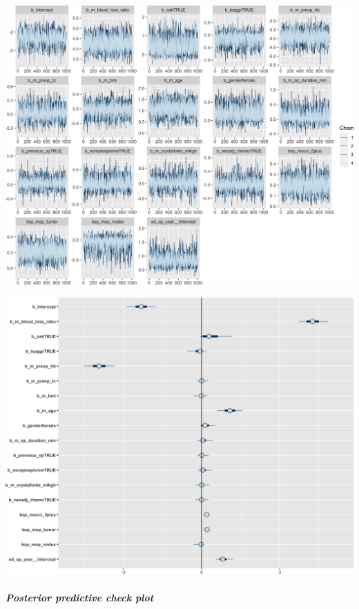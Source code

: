 \documentclass[
]{article}
\begin{document}
\begin{center}\includegraphics[width=1\linewidth]{notebook_files/figure-latex/model1full_diagnostics-1} \end{center}

\begin{center}\includegraphics[width=1\linewidth]{notebook_files/figure-latex/model1full_diagnostics-2} \end{center}

\hypertarget{posterior-predictive-check-plot}{%
\subparagraph{Posterior predictive check plot}\label{posterior-predictive-check-plot}}
\end{document}
